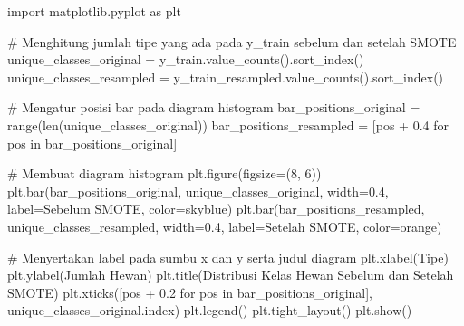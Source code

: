 \documentclass[
  letterpaper,
]{krantz}
\makeatletter
\newenvironment{Shaded}{\begin{snugshade}}{\end{snugshade}}
\newcommand{\BuiltInTok}[1]{\textcolor[rgb]{0.00,0.23,0.31}{#1}}
\newcommand{\CommentTok}[1]{\textcolor[rgb]{0.37,0.37,0.37}{#1}}
\newcommand{\ControlFlowTok}[1]{\textcolor[rgb]{0.00,0.23,0.31}{#1}}
\newcommand{\DecValTok}[1]{\textcolor[rgb]{0.68,0.00,0.00}{#1}}
\newcommand{\FloatTok}[1]{\textcolor[rgb]{0.68,0.00,0.00}{#1}}
\newcommand{\ImportTok}[1]{\textcolor[rgb]{0.00,0.46,0.62}{#1}}
\newcommand{\KeywordTok}[1]{\textcolor[rgb]{0.00,0.23,0.31}{#1}}
\newcommand{\NormalTok}[1]{\textcolor[rgb]{0.00,0.23,0.31}{#1}}
\newcommand{\OperatorTok}[1]{\textcolor[rgb]{0.37,0.37,0.37}{#1}}
\newcommand{\StringTok}[1]{\textcolor[rgb]{0.13,0.47,0.30}{#1}}
\newenvironment{kframe}{%
\medskip{}
\setlength{\fboxsep}{.8em}
 \def\at@end@of@kframe{}%
 \ifinner\ifhmode%
  \def\at@end@of@kframe{\end{minipage}}%
  \begin{minipage}{\columnwidth}%
 \fi\fi%
 \def\FrameCommand##1{\hskip\@totalleftmargin \hskip-\fboxsep
 \colorbox{shadecolor}{##1}\hskip-\fboxsep
     \hskip-\linewidth \hskip-\@totalleftmargin \hskip\columnwidth}%
 \MakeFramed {\advance\hsize-\width
   \@totalleftmargin\z@ \linewidth\hsize
   \@setminipage}}%
 {\par\unskip\endMakeFramed%
 \at@end@of@kframe}
\renewenvironment{Shaded}{\begin{kframe}}{\end{kframe}}
\makeatother
\begin{document}
\begin{Shaded}
\begin{Highlighting}[]
\ImportTok{import}\NormalTok{ matplotlib.pyplot }\ImportTok{as}\NormalTok{ plt}

\CommentTok{\# Menghitung jumlah tipe yang ada pada y\_train sebelum dan setelah SMOTE}
\NormalTok{unique\_classes\_original }\OperatorTok{=}\NormalTok{ y\_train.value\_counts().sort\_index()}
\NormalTok{unique\_classes\_resampled }\OperatorTok{=}\NormalTok{ y\_train\_resampled.value\_counts().sort\_index()}

\CommentTok{\# Mengatur posisi bar pada diagram histogram}
\NormalTok{bar\_positions\_original }\OperatorTok{=} \BuiltInTok{range}\NormalTok{(}\BuiltInTok{len}\NormalTok{(unique\_classes\_original))}
\NormalTok{bar\_positions\_resampled }\OperatorTok{=}\NormalTok{ [pos }\OperatorTok{+} \FloatTok{0.4} \ControlFlowTok{for}\NormalTok{ pos }\KeywordTok{in}\NormalTok{ bar\_positions\_original]}

\CommentTok{\# Membuat diagram histogram}
\NormalTok{plt.figure(figsize}\OperatorTok{=}\NormalTok{(}\DecValTok{8}\NormalTok{, }\DecValTok{6}\NormalTok{))}
\NormalTok{plt.bar(bar\_positions\_original, unique\_classes\_original, width}\OperatorTok{=}\FloatTok{0.4}\NormalTok{, label}\OperatorTok{=}\StringTok{\textquotesingle{}Sebelum SMOTE\textquotesingle{}}\NormalTok{, color}\OperatorTok{=}\StringTok{\textquotesingle{}skyblue\textquotesingle{}}\NormalTok{)}
\NormalTok{plt.bar(bar\_positions\_resampled, unique\_classes\_resampled, width}\OperatorTok{=}\FloatTok{0.4}\NormalTok{, label}\OperatorTok{=}\StringTok{\textquotesingle{}Setelah SMOTE\textquotesingle{}}\NormalTok{, color}\OperatorTok{=}\StringTok{\textquotesingle{}orange\textquotesingle{}}\NormalTok{)}

\CommentTok{\# Menyertakan label pada sumbu x dan y serta judul diagram}
\NormalTok{plt.xlabel(}\StringTok{\textquotesingle{}Tipe\textquotesingle{}}\NormalTok{)}
\NormalTok{plt.ylabel(}\StringTok{\textquotesingle{}Jumlah Hewan\textquotesingle{}}\NormalTok{)}
\NormalTok{plt.title(}\StringTok{\textquotesingle{}Distribusi Kelas Hewan Sebelum dan Setelah SMOTE\textquotesingle{}}\NormalTok{)}
\NormalTok{plt.xticks([pos }\OperatorTok{+} \FloatTok{0.2} \ControlFlowTok{for}\NormalTok{ pos }\KeywordTok{in}\NormalTok{ bar\_positions\_original], unique\_classes\_original.index)}
\NormalTok{plt.legend()}
\NormalTok{plt.tight\_layout()}
\NormalTok{plt.show()}
\end{Highlighting}
\end{Shaded}
\end{document}

